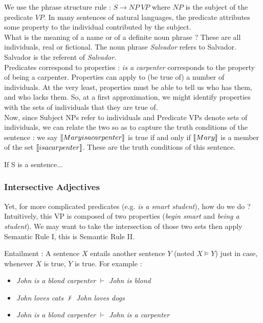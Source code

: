 \documentclass{cours}
\begin{document}
We use the phrase structure rule : $S \rightarrow NP \ VP$ where $NP$ is the subject of the predicate $VP$. In many sentences of natural languages, the predicate attributes some property to the individual contributed by the subject.\\
What is the meaning of a name or of a definite noun phrase ? These are all individuals, real or fictional. The noun phrase \textsl{Salvador} refers to Salvador. Salvador is the referent of \textsl{Salvador}.\\
Predicates correspond to properties : \textsl{is a carpenter} corresponds to the property of being a carpenter. Properties can apply to (be true of) a number of individuals. At the very least, properties must be able to tell us who has them, and who lacks them. So, at a first approximation, we might identify properties with the sets of individuals that they are true of.\\


Now, since Subject NPs refer to individuals and Predicate VPs denote sets of individuals, we can relate the two so as to capture the truth conditions of the sentence : we say $\left\llbracket Mary is a carpenter \right\rrbracket$ is true if and only if $\left\llbracket Mary \right\rrbracket$ is a member of the set $\left\llbracket is a carpenter \right\rrbracket$. These are the truth conditions of this sentence.
\begin{proposition}
    If S is a sentence...     
\end{proposition}

\subsubsection{Intersective Adjectives}
Yet, for more complicated predicates (e.g. \textsl{is a smart student}), how do we do ? Intuitively, this VP is composed of two properties (\textsl{begin smart} and \textsl{being a student}). We may want to take the intersection of those two sets then apply Semantic Rule I, this is Semantic Rule II. 
\begin{definition}
    Entailment : A sentence $X$ entails another sentence $Y$ (noted $X \models Y$) just in case, whenever $X$ is true, $Y$ is true. For example : 
    \begin{itemize}
        \item \textsl{John is a blond carpenter} $\vdash$ \textsl{John is blond}
        \item \textsl{John loves cats} $\nvdash$ \textsl{John loves dogs}
        \item \textsl{John is a blond carpenter} $\vdash$ \textsl{John is a carpenter}
    \end{itemize}
\end{definition}
\end{document}
